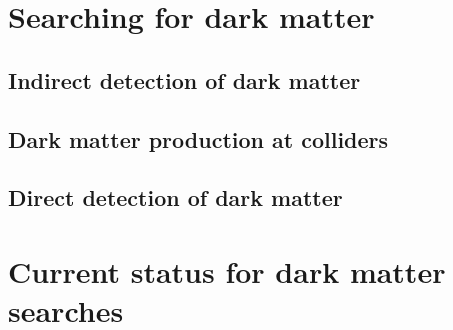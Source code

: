 \section{Searching for dark matter}\label{sec:DMOverview/DetectionOfDM}

\subsection{Indirect detection of dark matter}\label{sec:DMOverview/IndirectDM}

\subsection{Dark matter production at colliders}\label{sec:DMOverview/DMProdColliders}

\subsection{Direct detection of dark matter}\label{sec:DMOverview/DirectDetection}

\section{Current status for dark matter searches}\label{sec:DMOverview/DMCurrentStatus}